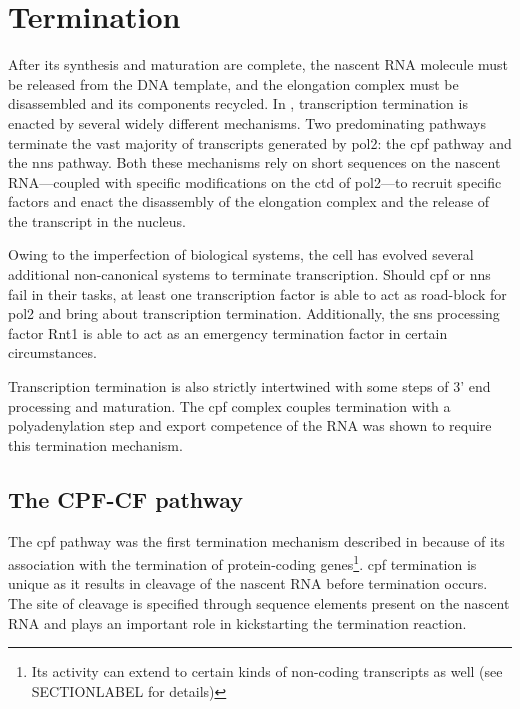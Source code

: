 \section{Termination} \label{termination} %
After its synthesis and maturation are complete, the nascent RNA molecule must be released from the DNA template, and the elongation complex must be disassembled and its components recycled.
In \cer{}, transcription termination is enacted by several widely different mechanisms.
Two predominating pathways terminate the vast majority of transcripts generated by \acrlong{pol2}: the \gls{cpf} pathway and the \gls{nns}  pathway. 
Both these mechanisms rely on short sequences on the nascent RNA---coupled with specific modifications on the \gls{ctd} of \gls{pol2}---to recruit specific factors and enact the disassembly of the elongation complex and the release of the transcript in the nucleus.

Owing to the imperfection of biological systems, the cell has evolved several additional non-canonical systems to terminate transcription. Should \gls{cpf} or \gls{nns} fail in their tasks, at least one transcription factor is able to act as road-block for \gls{pol2} and bring about transcription termination. Additionally, the \gls{sns} processing factor Rnt1 is able to act as an emergency termination factor in certain circumstances. 

Transcription termination is also strictly intertwined with some steps of 3' end processing and maturation. 
The \gls{cpf} complex couples termination with a polyadenylation step and export competence of the RNA was shown to require this termination mechanism.  




\subsection{The CPF-CF pathway}
The \gls{cpf} pathway was the first termination mechanism described in \cer{} because of its association with the termination of protein-coding genes\footnote{Its activity can extend to certain kinds of non-coding transcripts as well (see SECTIONLABEL for details)}. 
\gls{cpf} termination is unique as it results in cleavage of the nascent RNA before termination occurs.
The site of cleavage is specified through sequence elements present on the nascent RNA and plays an important role in kickstarting the termination reaction.

